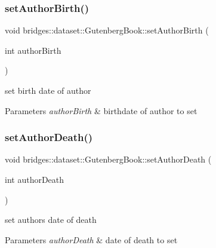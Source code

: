 \subsubsection{\texorpdfstring{set\+Author\+Birth()}{setAuthorBirth()}}
{\footnotesize\ttfamily void bridges\+::dataset\+::\+Gutenberg\+Book\+::set\+Author\+Birth (\begin{DoxyParamCaption}\item[{int}]{author\+Birth }\end{DoxyParamCaption})\hspace{0.3cm}{\ttfamily [inline]}}

set birth date of author 
\begin{DoxyParams}{Parameters}
{\em author\+Birth} & birthdate of author to set \\
\hline
\end{DoxyParams}
\mbox{\label{classbridges_1_1dataset_1_1_gutenberg_book_a938d0e579e5d2b2c0c62a6ea22317223}} 
\subsubsection{\texorpdfstring{set\+Author\+Death()}{setAuthorDeath()}}
{\footnotesize\ttfamily void bridges\+::dataset\+::\+Gutenberg\+Book\+::set\+Author\+Death (\begin{DoxyParamCaption}\item[{int}]{author\+Death }\end{DoxyParamCaption})\hspace{0.3cm}{\ttfamily [inline]}}

set author\textquotesingle{}s date of death 
\begin{DoxyParams}{Parameters}
{\em author\+Death} & date of death to set \\
\hline
\end{DoxyParams}
\mbox{\label{classbridges_1_1dataset_1_1_gutenberg_book_a09215f3b16398ecd44601d02783a3d31}} 
